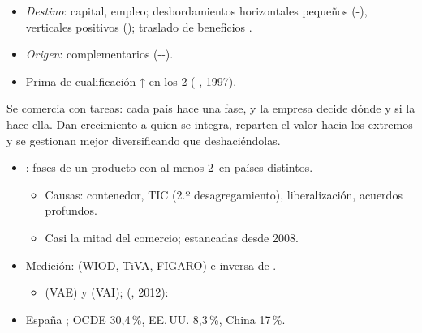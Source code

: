 \documentclass{article}
\begin{document}
\begin{columnas}
\begin{itemize}
\end{itemize}
\begin{itemize}
\item \emph{Destino}: capital, empleo; desbordamientos horizontales pequeños (-), verticales positivos (); traslado de beneficios .
\item \emph{Origen}: complementarios (--).
\item Prima de cualificación ↑ en los 2 (-, 1997).
\end{itemize}

\begin{ideaclave}
Se comercia con tareas: cada país hace una fase, y la empresa decide dónde y si la hace ella. Dan crecimiento a quien se integra, reparten el valor hacia los extremos y se gestionan mejor diversificando que deshaciéndolas.
\end{ideaclave}

\begin{itemize}
\item {}: fases de un producto con al menos 2~en países distintos.
  \begin{itemize}
  \item Causas: contenedor, TIC (2.º desagregamiento), liberalización, acuerdos profundos.
  \item Casi la mitad del comercio; estancadas desde 2008.
  \end{itemize}
\item Medición:  (WIOD, TiVA, FIGARO) e inversa de .
  \begin{itemize}
  \item {} (VAE) y  (VAI);  (, 2012):
  \end{itemize}
\item España ; OCDE 30,4\,\%, EE.\,UU. 8,3\,\%, China 17\,\%.
\end{itemize}


\end{columnas}
\end{document}
